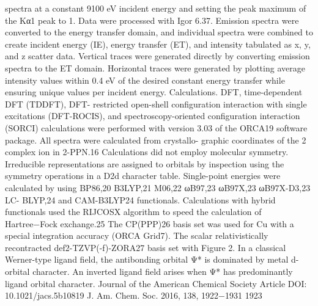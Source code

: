 spectra at a constant 9100 eV incident energy and setting the peak
maximum of the Kα1 peak to 1.
Data were processed with Igor 6.37. Emission spectra were
converted to the energy transfer domain, and individual spectra were
combined to create incident energy (IE), energy transfer (ET), and
intensity tabulated as x, y, and z scatter data. Vertical traces were
generated directly by converting emission spectra to the ET domain.
Horizontal traces were generated by plotting average intensity values
within 0.4 eV of the desired constant energy transfer while ensuring
unique values per incident energy.
Calculations. DFT, time-dependent DFT (TDDFT), DFT-
restricted open-shell conﬁguration interaction with single excitations
(DFT-ROCIS), and spectroscopy-oriented conﬁguration interaction
(SORCI) calculations were performed with version 3.03 of the
ORCA19 software package. All spectra were calculated from crystallo-
graphic coordinates of the 2 complex ion in 2-PPN.16 Calculations did
not employ molecular symmetry. Irreducible representations are
assigned to orbitals by inspection using the symmetry operations in a
D2d character table. Single-point energies were calculated by using
BP86,20 B3LYP,21 M06,22 ωB97,23 ωB97X,23 ωB97X-D3,23 LC-
BLYP,24 and CAM-B3LYP24 functionals. Calculations with hybrid
functionals used the RIJCOSX algorithm to speed the calculation of
Hartree−Fock exchange.25 The CP(PPP)26 basis set was used for Cu
with a special integration accuracy (ORCA Grid7). The scalar
relativistically recontracted def2-TZVP(-f)-ZORA27 basis set with
Figure 2. In a classical Werner-type ligand ﬁeld, the antibonding
orbital Ψ* is dominated by metal d-orbital character. An inverted
ligand ﬁeld arises when Ψ* has predominantly ligand orbital character.
Journal of the American Chemical Society
Article
DOI: 10.1021/jacs.5b10819
J. Am. Chem. Soc. 2016, 138, 1922−1931
1923


